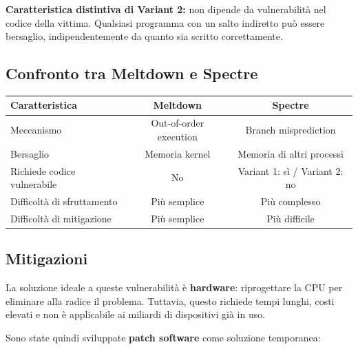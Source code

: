 \documentclass{article}
\begin{document}
\noindent\textbf{Caratteristica distintiva di Variant 2:} non dipende 
da vulnerabilità nel codice della vittima. Qualsiasi programma con 
un salto indiretto può essere bersaglio, indipendentemente da quanto 
sia scritto correttamente.

\subsection*{Confronto tra Meltdown e Spectre}

\begin{center}
\begin{tabular}{|l|c|c|}
\hline
\textbf{Caratteristica} & \textbf{Meltdown} & \textbf{Spectre} \\
\hline
Meccanismo & Out-of-order execution & Branch misprediction \\
Bersaglio & Memoria kernel & Memoria di altri processi \\
Richiede codice vulnerabile & No & Variant 1: sì / Variant 2: no \\
Difficoltà di sfruttamento & Più semplice & Più complesso \\
Difficoltà di mitigazione & Più semplice & Più difficile \\
\hline
\end{tabular}
\end{center}

\subsection*{Mitigazioni}

La soluzione ideale a queste vulnerabilità è \textbf{hardware}: 
riprogettare la CPU per eliminare alla radice il problema. Tuttavia, 
questo richiede tempi lunghi, costi elevati e non è applicabile 
ai miliardi di dispositivi già in uso.

Sono state quindi sviluppate \textbf{patch software} come soluzione 
temporanea:
\end{document}
